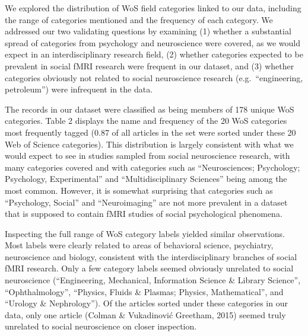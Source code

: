 \documentclass[
  man,floatsintext]{apa6}
\begin{document}
We explored the distribution of WoS field categories linked to our data, including the range of categories mentioned and the frequency of each category. We addressed our two validating questions by examining (1) whether a substantial spread of categories from psychology and neuroscience were covered, as we would expect in an interdisciplinary research field, (2) whether categories expected to be prevalent in social fMRI research were frequent in our dataset, and (3) whether categories obviously not related to social neuroscience research (e.g.~``engineering, petroleum'') were infrequent in the data.

The records in our dataset were classified as being members of 178 unique WoS categories. Table 2 displays the name and frequency of the 20 WoS categories most frequently tagged (0.87 of all articles in the set were sorted under these 20 Web of Science categories). This distribution is largely consistent with what we would expect to see in studies sampled from social neuroscience research, with many categories covered and with categories such as ``Neurosciences; Psychology; Psychology, Experimental'' and ``Multidisciplinary Sciences'' being among the most common. However, it is somewhat surprising that categories such as ``Psychology, Social'' and ``Neuroimaging'' are not more prevalent in a dataset that is supposed to contain fMRI studies of social psychological phenomena.

Inspecting the full range of WoS category labels yielded similar observations. Most labels were clearly related to areas of behavioral science, psychiatry, neuroscience and biology, consistent with the interdisciplinary branches of social fMRI research. Only a few category labels seemed obviously unrelated to social neuroscience (``Engineering, Mechanical, Information Science \& Library Science'', ``Ophthalmology'', ``Physics, Fluids \& Plasmas; Physics, Mathematical'', and ``Urology \& Nephrology''). Of the articles sorted under these categories in our data, only one article (Colman \& Vukadinović Greetham, 2015) seemed truly unrelated to social neuroscience on closer inspection.
\end{document}
